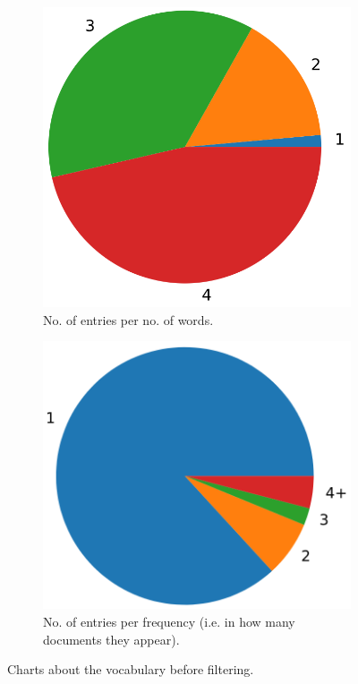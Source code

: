 \begin{figure}
  \begin{subfigure}[t]{0.45\textwidth}
    \centering
    \includegraphics[width=\textwidth]{figures/vocab/before/n_words.PNG}
    \caption{No. of entries per no. of words.}
    \label{fig:vocab_before_words}
  \end{subfigure}
  \hfill
  \begin{subfigure}[t]{0.48\textwidth}
    \centering
    \includegraphics[width=\textwidth]{figures/vocab/before/entry_frequency.PNG}
    \caption{No. of entries per frequency (i.e. in how many documents they appear).}
    \label{fig:vocab_before_freq}
  \end{subfigure}
  \caption{Charts about the vocabulary before filtering.}
\end{figure}

